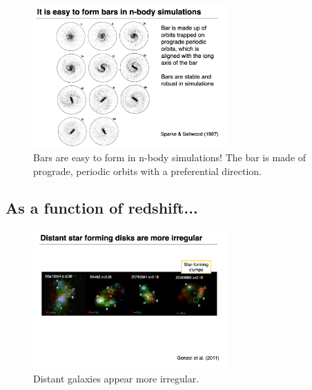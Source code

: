\documentclass{article}
\begin{document}
\begin{figure}
    \centering
    \includegraphics[width=0.66\textwidth]{figs/Screen Shot 2021-10-27 at 10.46.40 AM.png}
    \caption{Bars are easy to form in n-body simulations! The bar is made of prograde, periodic orbits with a preferential direction. }
    \label{fig:nbody_sim_bars}
\end{figure}

\subsection{As a function of redshift...}

\begin{figure}
    \centering
    \includegraphics[width=0.66\textwidth]{figs/Screen Shot 2021-10-27 at 10.49.05 AM.png}
    \caption{Distant galaxies appear more irregular.}
    \label{fig:irregular_z}
\end{figure}
\end{document}
